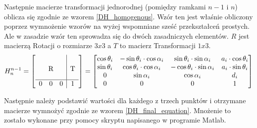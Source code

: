 Następnie macierze transformacji jednorodnej (pomiędzy ramkami $n-1$ i $n$) oblicza się zgodnie ze wzorem \ref{DH_homogenous}. Wzór ten jest właśnie obliczony poprzez wymnożenie wzorów na wyżej wspomniane sześć przekształceń prostych. Ale w zasadzie wzór ten sprowadza się do dwóch zasadniczych elementów. $R$ jest macierzą Rotacji o rozmiarze $3x3$ a $T$ to macierz Transformacji $1x3$. \cite{DH_matrix_AA_article}\\

\begin{equation} \label{DH_homogenous}
H^{n-1}_n = 
\left[\begin{array}{ccc|c}
&&&\\
&&&\\
\multicolumn{3}{c|}{\smash{\raisebox{0.75\normalbaselineskip}{R}}} & \smash{\raisebox{0.75\normalbaselineskip}{T}}\\
\hline
0 & 0 & 0 & 1\\
\end{array}\right] = 
\left[\begin{matrix}
\cos{\theta_i} & -\sin{\theta_i} \cdot \cos{\alpha_i} & \sin{\theta_i} \cdot \sin{\alpha_i} & a_i \cdot \cos{\theta_i}\\
\sin{\theta_i} & \cos{\theta_i} \cdot \cos{\alpha_i} & -\cos{\theta_i} \cdot \sin{\alpha_i} & a_i \cdot \sin{\theta_i}\\
0 & \sin{\alpha_i} & \cos{\alpha_i} & d_i\\
0 & 0 & 0 & 1\\
\end{matrix}\right]
\end{equation}


Następnie należy podstawić wartości dla każdego z trzech punktów i otrzymane macierze wymnożyć zgodnie ze wzorem \ref{DH_final_equation}. Mnożenie to zostało wykonane przy pomocy skryptu napisanego w programie Matlab. %

